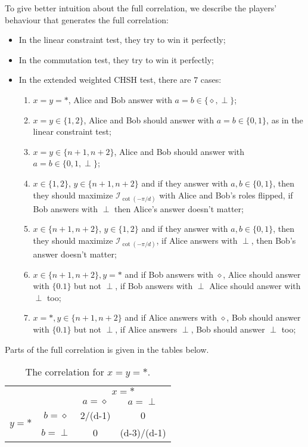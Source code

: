 \documentclass[11pt,letterpaper]{article}
\newcommand{\1}{\mathbb{1}}
\newcommand{\I}{\mathcal{I}}
\theoremstyle{definition}
\begin{document}
To give better intuition about the full correlation, we describe the players' behaviour that 
generates the full correlation:
\begin{itemize}
	\item In the linear constraint test, they try to win it perfectly;
	\item In the commutation test, they try to win it perfectly;
	\item In the extended weighted CHSH test, there are $7$ cases:
	\begin{enumerate}
	\item $x = y = \ast$, Alice and Bob answer with $a = b \in \{\diamond, \perp\}$;
	\item $x = y \in \{1,2\}$, Alice and Bob should answer with $a = b \in \{0, 1\}$, as in the linear constraint test;
	\item $x = y \in \{n+1, n+2\}$, Alice and Bob should answer with $a = b \in \{0, 1, \perp\}$;
	\item $x \in \{1,2\}$, $y \in \{n+1, n+2\}$ and if they answer with $a,b \in \{0,1\}$, then
	they should maximize $\I_{\cot(-\pi/d)}$ with Alice and Bob's roles flipped, if Bob answers with $\perp$
	then Alice's answer doesn't matter;
	\item $x \in \{n+1, n+2\}$, $y \in \{1,2\}$ and if they answer with $a,b \in \{0,1\}$, then
	they should maximize $\I_{\cot(-\pi/d)}$, if Alice answers with $\perp$, then Bob's answer doesn't matter;
	\item $x \in \{n+1,n+2\}, y = \ast$ and if Bob answers with $\diamond$, Alice should answer with $\{0.1\}$ but not $\perp$, if Bob answers with $\perp$ Alice should answer with $\perp$ too;
	\item $x = \ast, y \in \{n+1, n+2\}$ and if Alice answers with $\diamond$, Bob should answer with $\{0.1\}$ but not $\perp$, 
	if Alice answers $\perp$, Bob should answer $\perp$ too;
\end{enumerate}
\end{itemize}

Parts of the full correlation is given in the tables below.
\begin{table}[H]
\begin{center}
\begin{tabular}{|c|c||c|c|}
\hline
\multicolumn{2}{|c|}{} &
\multicolumn{2}{|c|}{$x=\ast$}\\
\cline{3-4}
\multicolumn{2}{|c|}{} &$a = \diamond$ & $a = \perp$ \\
\hline
\hline
\multirow{2}{*}{$y = \ast$} & $b=\diamond$ & 2/(d-1) & 0 \\
\cline{2-4}
&$b=\perp$ & 0 & (d-3)/(d-1) \\
\hline
\end{tabular}
\caption{The correlation for $x=y=\ast$.}
\end{center}
\end{table}
\end{document}
